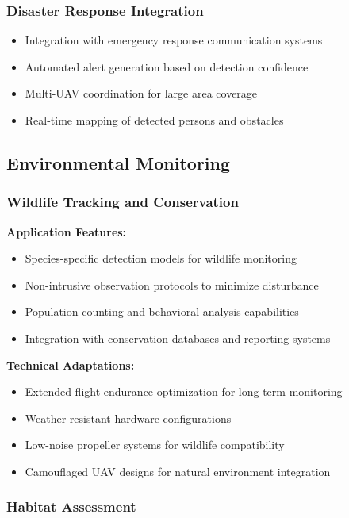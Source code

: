 \documentclass[11pt,a4paper]{article}
\begin{document}
\subsubsection{Disaster Response Integration}

\begin{itemize}
    \item Integration with emergency response communication systems
    \item Automated alert generation based on detection confidence
    \item Multi-UAV coordination for large area coverage
    \item Real-time mapping of detected persons and obstacles
\end{itemize}

\subsection{Environmental Monitoring}

\subsubsection{Wildlife Tracking and Conservation}

\textbf{Application Features:}
\begin{itemize}
    \item Species-specific detection models for wildlife monitoring
    \item Non-intrusive observation protocols to minimize disturbance
    \item Population counting and behavioral analysis capabilities
    \item Integration with conservation databases and reporting systems
\end{itemize}

\textbf{Technical Adaptations:}
\begin{itemize}
    \item Extended flight endurance optimization for long-term monitoring
    \item Weather-resistant hardware configurations
    \item Low-noise propeller systems for wildlife compatibility
    \item Camouflaged UAV designs for natural environment integration
\end{itemize}

\subsubsection{Habitat Assessment}
\end{document}
